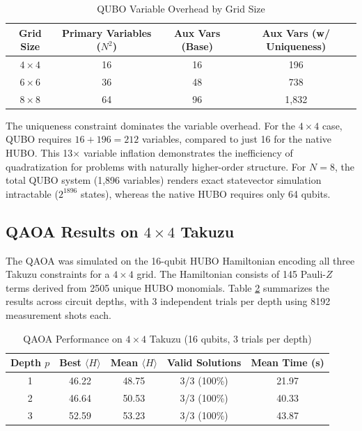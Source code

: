 \documentclass[eng]{ajceam-class}
\begin{document}
\begin{table}[h]
\centering
\caption{QUBO Variable Overhead by Grid Size}
\begin{tabular}{|c|c|c|c|}
\hline
\textbf{Grid Size} & \textbf{Primary Variables ($N^2$)} & \textbf{Aux Vars (Base)} & \textbf{Aux Vars (w/ Uniqueness)} \\
\hline
$4 \times 4$ & 16 & 16 & 196 \\
$6 \times 6$ & 36 & 48 & 738 \\
$8 \times 8$ & 64 & 96 & 1,832 \\
\hline
\end{tabular}
\label{tab:overhead}
\end{table}

The uniqueness constraint dominates the variable overhead. For the $4 \times 4$ case, QUBO requires $16 + 196 = 212$ variables, compared to just 16 for the native HUBO. This 13$\times$ variable inflation demonstrates the inefficiency of quadratization for problems with naturally higher-order structure. For $N=8$, the total QUBO system (1,896 variables) renders exact statevector simulation intractable ($2^{1896}$ states), whereas the native HUBO requires only 64 qubits.

\subsection{QAOA Results on $4 \times 4$ Takuzu}

The QAOA was simulated on the 16-qubit HUBO Hamiltonian encoding all three Takuzu constraints for a $4 \times 4$ grid. The Hamiltonian consists of 145 Pauli-$Z$ terms derived from 2505 unique HUBO monomials. Table \ref{tab:qaoa_results} summarizes the results across circuit depths, with 3 independent trials per depth using 8192 measurement shots each.

\begin{table}[h]
\centering
\caption{QAOA Performance on $4 \times 4$ Takuzu (16 qubits, 3 trials per depth)}
\begin{tabular}{|c|c|c|c|c|}
\hline
\textbf{Depth $p$} & \textbf{Best $\langle H \rangle$} & \textbf{Mean $\langle H \rangle$} & \textbf{Valid Solutions} & \textbf{Mean Time (s)} \\
\hline
1 & 46.22 & 48.75 & 3/3 (100\%) & 21.97 \\
2 & 46.64 & 50.53 & 3/3 (100\%) & 40.33 \\
3 & 52.59 & 53.23 & 3/3 (100\%) & 43.87 \\
\hline
\end{tabular}
\label{tab:qaoa_results}
\end{table}
\end{document}
